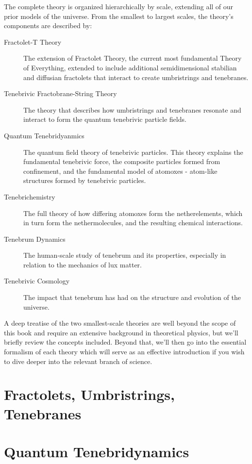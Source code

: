 The complete theory is organized hierarchically by scale, extending all of our
prior models of the universe. From the smallest to largest scales, the theory's
components are described by:
\begin{description}
  \item[Fractolet-T Theory] The extension of Fractolet Theory, the current most
    fundamental Theory of Everything, extended to include additional
    semidimensional stabilian and diffusian fractolets that interact to create
    umbristrings and tenebranes.
  \item[Tenebrivic Fractobrane-String Theory] The theory that describes how
    umbristrings and tenebranes resonate and interact to form the quantum
    tenebrivic particle fields.
  \item[Quantum Tenebridyanmics] The quantum field theory of tenebrivic particles. This
    theory explains the fundamental tenebrivic force, the composite particles
    formed from confinement, and the fundamental model of atomoxes - atom-like
    structures formed by tenebrivic particles.
  \item[Tenebrichemistry] The full theory of how differing atomoxes form the
    netherelements, which in turn form the nethermolecules, and the resulting
    chemical interactions.
  \item[Tenebrum Dynamics] The human-scale study of tenebrum and its properties,
    especially in relation to the mechanics of lux matter.
  \item[Tenebrivic Cosmology] The impact that tenebrum has had on the structure and
    evolution of the universe.
\end{description}

A deep treatise of the two smallest-scale theories are well beyond the scope of
this book and require an extensive background in theoretical physics, but we'll
briefly review the concepts included. Beyond that, we'll then go into the
essential formalism of each theory which will serve as an effective
introduction if you wish to dive deeper into the relevant branch of science.

\section{Fractolets, Umbristrings, Tenebranes}

\section{Quantum Tenebridynamics}

